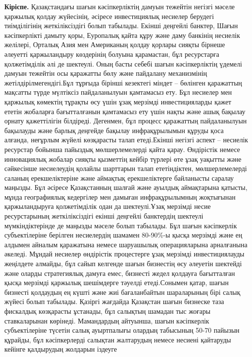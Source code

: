 {\bfseries Кіріспе.} Қазақстандағы шағын кәсіпкерліктің дамуын тежейтін
негізгі мәселе қаржылық қолдау жүйесінің, әсіресе инвестициялық несиелер
берудегі тиімділігінің жеткіліксіздігі болып табылады. Екінші деңгейлі
банктер, Шағын кәсіпкерлікті дамыту қоры, Еуропалық қайта құру және даму
банкінің несиелік желілері, Орталық Азия мен Американың қолдау қорлары
сияқты бірнеше әлеуетті қаржыландыру көздерінің болуына қарамастан, бұл
ресурстарға қолжетімділік әлі де шектеулі. Оның басты себебі шағын
кәсіпкерліктің үдемелі дамуын тежейтін осы қаражатты бөлу және пайдалану
механизмінің жетілдірілмегендігі.Бұл тұрғыда бірінші кезектегі міндет --
бөлінген қаражаттың мақсатты түрде мүлтіксіз пайдаланылуын қамтамасыз
ету. Бұл несиелер мен қаржылық көмектің тұрақты өсу үшін ұзақ мерзімді
инвестицияларды қажет ететін жобаларға бағытталғанын қамтамасыз ету үшін
нақты және ашық бақылау орнату қажеттілігін білдіреді. Дегенмен, бұл
процесс қаражаттың пайдаланылуын бақылауды және барлық деңгейде бақылау
инфрақұрылымын құруды қоса алғанда, неғұрлым жүйелі көзқарасты талап
етеді.Екінші негізгі аспект -- несиелік ресурстар бойынша пайыздық
мөлшерлемелерді қайта қарау. Өндірістік немесе инновациялық жобалар
сияқты қызметтің кейбір түрлері өте ұзақ уақытты және сәйкесінше
несиелеудің қолайлы шарттарын талап ететіндіктен, мөлшерлемелерді
саланың ерекшеліктеріне және аймақтық ерекшеліктерге байланысты саралау
маңызды. Бұл әсіресе Қазақстанның шалғай және ауылдық аймақтарына
қатысты, мұнда географиялық кедергілер мен дамыған инфрақұрылымның
жоқтығынан қаржыландыруға қолжетімділік одан да шектеулі.Ұзақ мерзімді
несие ресурстарының жеткіліксіздігі екінші деңгейлі банктердің шектеулі
мүмкіндіктерінде де маңызды мәселе болып табылады. Бұл шағын кәсіпкерлік
субъектілеріне берілген несиелердің шамамен 80-90\%-ы қысқа мерзімді
және ең алдымен айналым қаражатына немесе шаруашылық операцияларына
арналғанына әкеледі. Мұндай несиелер өндірістік процестерге ұзақ
мерзімді инвестициялауды жеңілдете алмайды, бұл сайып келгенде шағын
бизнестің өсу әлеуетін шектейді және оларды стратегиялық дамуға емес,
бизнесті жедел қолдауға бағытталған қысқа мерзімді қаржылық шешімдерге
тәуелді етеді.Сонымен қатар, шағын бизнесті қолдаудың ең күшті және жиі
бағаланбайтын шараларының бірі салық жүйесі болып табылады. Қазіргі
жағдайда Қазақстан шағын бизнеске таза фискалдық көзқарасты ұстанады,
бұл салықтың шамадан тыс жоғары ставкаларынан көрінеді. Мамандардың
айтуынша, шағын кәсіпкерлік субъектілеріне түсетін салық ауыртпалығы
олардың табысының 50-70 пайызын құрайды, бұл кәсіпкерлерді салықтан
жалтарудың немесе несиені қайтаруды кейінге қалдырудың жолдарын іздеуге
